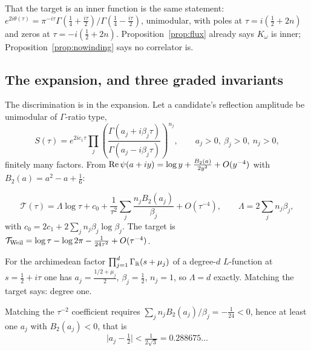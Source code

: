 That the target is an inner function is the same statement:
$e^{2i\theta(\tau)}=\pi^{-i\tau}\Gamma(\frac14+\frac{i\tau}2)/
\Gamma(\frac14-\frac{i\tau}2)$, unimodular, with poles at $\tau=i(\frac12+2n)$ and
zeros at $\tau=-i(\frac12+2n)$. Proposition~\ref{prop:flux} already says
$K_\omega$ is inner; Proposition~\ref{prop:nowinding} says no correlator is.

\subsection{The expansion, and three graded invariants}

The discrimination is in the expansion. Let a candidate's reflection amplitude be
unimodular of $\Gamma$-ratio type,
\begin{equation}\label{eq:gammaratio}
 S(\tau)=e^{2ic_1\tau}\prod_j
 \left(\frac{\Gamma(a_j+i\beta_j\tau)}{\Gamma(a_j-i\beta_j\tau)}\right)^{n_j},
 \qquad a_j>0,\ \beta_j>0,\ n_j>0,
\end{equation}
finitely many factors. From $\operatorname{Re}\psi(a+iy)=\log y+\frac{B_2(a)}{2y^2}+O(y^{-4})$
with $B_2(a)=a^2-a+\frac16$:

\begin{proposition}\label{prop:expansion}
\[
 \mathcal T(\tau)=\Lambda\log\tau+c_0
 +\frac1{\tau^2}\sum_j\frac{n_jB_2(a_j)}{\beta_j}+O(\tau^{-4}),
 \qquad \Lambda=2\sum_jn_j\beta_j,
\]
with $c_0=2c_1+2\sum_jn_j\beta_j\log\beta_j$. The target is
$\mathcal T_{\rm Weil}=\log\tau-\log2\pi-\frac1{24\tau^2}+O(\tau^{-4})$.
\end{proposition}

\begin{corollary}\label{cor:degree}
For the archimedean factor $\prod_{j=1}^d\Gamma_\mathbb R(s+\mu_j)$ of a degree-$d$
$L$-function at $s=\frac12+i\tau$ one has $a_j=\frac{1/2+\mu_j}2$,
$\beta_j=\frac12$, $n_j=1$, so $\Lambda=d$ exactly. Matching the target says:
degree one.
\end{corollary}

\begin{corollary}\label{cor:signrule}
Matching the $\tau^{-2}$ coefficient requires
$\sum_jn_jB_2(a_j)/\beta_j=-\frac1{24}<0$, hence at least one $a_j$ with
$B_2(a_j)<0$, that is
\[
 \Big|a_j-\tfrac12\Big|<\tfrac1{2\sqrt3}=0.288675\ldots
\]
\end{corollary}

